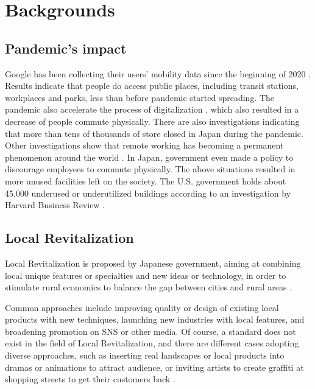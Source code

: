 \chapter{Backgrounds} \label{ch:2}

\section{Pandemic's impact}

Google has been collecting their users' mobility data since the beginning of 2020 \cite{googlemobilityreports} \cite{ourworldindata_2020}.
Results indicate that people do access public places, including transit stations, workplaces and parks, less than before pandemic started spreading.
The pandemic also accelerate the process of digitalization \cite{amankwah-amoah_khan_wood_knight_2021}, which also resulted in a decrease of people commute physically.
There are also investigations indicating that more than tens of thousands of store closed in Japan during the pandemic.
Other investigations show that remote working has becoming a permanent phenomenon around the world \cite{saad_wigert_2021}.
In Japan, government even made a policy to discourage employees to commute physically.
The above situations resulted in more unused facilities left on the society.
The U.S. government holds about 45,000 underused or underutilized buildings according to an investigation by Harvard Business Review \cite{hounsell_2020}.

\section{Local Revitalization}
Local Revitalization is proposed by Japanese government, aiming at combining local unique features or specialties and new ideas or technology,
in order to stimulate rural economics to balance the gap between cities and rural areas \cite{sawaji_2019}.

Common approaches include improving quality or design of existing local products with new techniques, launching new industries with local features, and broadening promotion on SNS or other media.
Of course, a standard does not exist in the field of Local Revitalization, and there are different cases adopting diverse approaches,
such as inserting real landscapes or local products into dramas or animations to attract audience,
or inviting artists to create graffiti at shopping streets to get their customers back \cite{中野経済新聞_2015}\cite{サンテレビニュース_2021}\cite{urbact_2019}.


